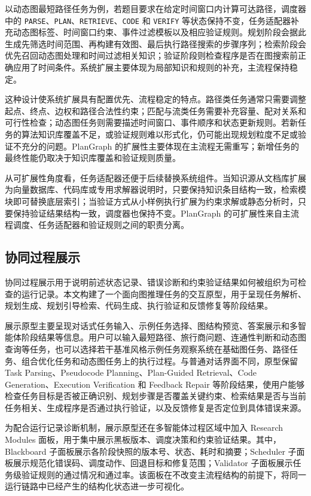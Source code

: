 以动态图最短路径任务为例，若题目要求在给定时间窗口内计算可达路径，调度器中的 \texttt{PARSE}、\texttt{PLAN}、\texttt{RETRIEVE}、\texttt{CODE} 和 \texttt{VERIFY} 等状态保持不变，任务适配器补充动态图标签、时间窗口约束、事件过滤模板以及相应验证规则。规划阶段会据此生成先筛选时间范围、再构建有效图、最后执行路径搜索的步骤序列；检索阶段会优先召回动态图处理和时间过滤相关知识；验证阶段则检查程序是否在图搜索前正确应用了时间条件。系统扩展主要体现为局部知识和规则的补充，主流程保持稳定。

这种设计使系统扩展具有配置优先、流程稳定的特点。路径类任务通常只需要调整起点、终点、边权和路径合法性约束；匹配与流类任务需要补充容量、配对关系和可行性检查；动态图任务则需要描述时间窗口、事件顺序和状态更新规则。若新任务的算法知识库覆盖不足，或验证规则难以形式化，仍可能出现规划粒度不足或验证不充分的问题。PlanGraph 的扩展性主要体现在主流程无需重写；新增任务的最终性能仍取决于知识库覆盖和验证规则质量。

从可扩展性角度看，任务适配器还便于后续替换系统组件。当知识源从文档库扩展为向量数据库、代码库或专用求解器说明时，只要保持知识条目结构一致，检索模块即可替换底层索引；当验证方式从小样例执行扩展为约束求解或静态分析时，只要保持验证结果结构一致，调度器也保持不变。PlanGraph 的可扩展性来自主流程调度、任务适配器和验证规则之间的职责分离。

\subsection{协同过程展示}

协同过程展示用于说明前述状态记录、错误诊断和约束验证结果如何被组织为可检查的运行记录。本文构建了一个面向图推理任务的交互原型，用于呈现任务解析、规划生成、规划引导检索、代码生成、执行验证和反馈修复等阶段结果。

展示原型主要呈现对话式任务输入、示例任务选择、图结构预览、答案展示和多智能体阶段结果等信息。用户可以输入最短路径、旅行商问题、连通性判断和动态图查询等任务，也可以选择若干基准风格示例任务观察系统在基础图任务、路径任务、组合优化任务和动态图任务上的执行过程。与普通对话界面不同，原型保留 Task Parsing、Pseudocode Planning、Plan-Guided Retrieval、Code Generation、Execution Verification 和 Feedback Repair 等阶段结果，使用户能够检查任务目标是否被正确识别、规划步骤是否覆盖关键约束、检索结果是否与当前任务相关、生成程序是否通过执行验证，以及反馈修复是否定位到具体错误来源。

为配合运行记录诊断机制，展示原型还在多智能体过程区域中加入 Research Modules 面板，用于集中展示黑板版本、调度决策和约束验证结果。其中，Blackboard 子面板展示各阶段快照的版本号、状态、耗时和摘要；Scheduler 子面板展示规范化错误码、调度动作、回退目标和修复范围；Validator 子面板展示任务级验证规则的通过情况和通过率。该面板在不改变主流程结构的前提下，将同一运行链路中已经产生的结构化状态进一步可视化。

